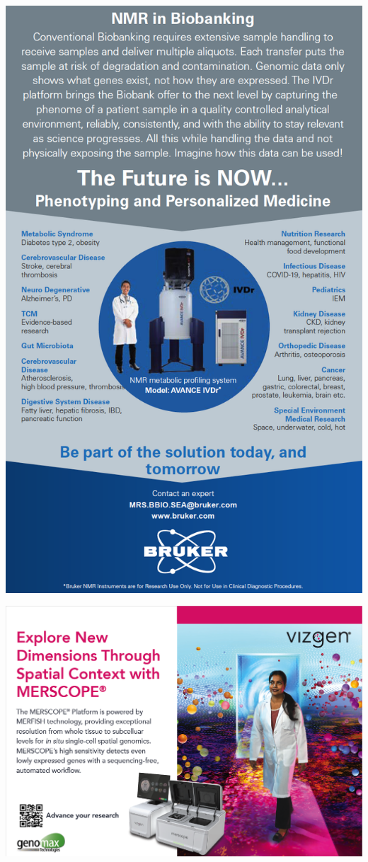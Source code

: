 \documentclass[
]{article}
\begin{document}
\href{https://www.bruker.com/en.html}{\includegraphics{./Page/elements/img/Exhibitors/Bruker.png}}

\href{https://www.genomaxtech.com}{\includegraphics{./Page/elements/img/Exhibitors/Genomax.png}}
\end{document}
